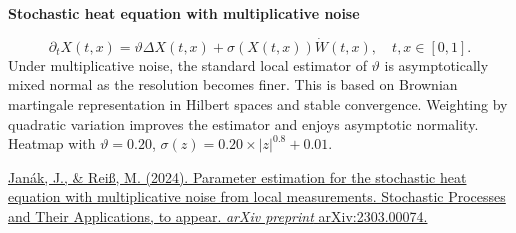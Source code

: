 {\myfontsize 
\begin{center}
\textbf{Stochastic heat equation with multiplicative noise}
\end{center}
\begin{equation*}
\partial_t X(t,x) =\vartheta \Delta X(t,x) +\sigma(X(t,x)) \dot{W}(t,x), \quad t,x \in [0,1].
\end{equation*}
Under multiplicative noise, the standard local estimator of $\vartheta$ is asymptotically mixed normal as the resolution becomes finer. This is based on Brownian martingale representation in Hilbert spaces and stable convergence. Weighting by quadratic variation improves the estimator and enjoys asymptotic normality. Heatmap with $\vartheta = 0.20$, $\sigma(z) = 0.20 \times |z|^{0.8} + 0.01$.\\ \par}
{\fontsize{12}{4}\selectfont
\href{https://arxiv.org/abs/2303.00074}{Janák, J., \& Reiß, M. (2024). Parameter estimation for the stochastic heat equation with multiplicative noise from local measurements.  Stochastic Processes and Their Applications, to appear. \textit{arXiv preprint} arXiv:2303.00074.}
\par
}